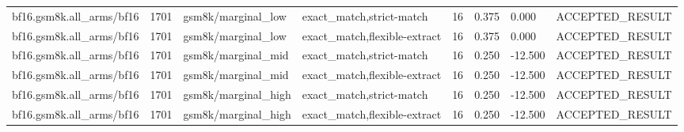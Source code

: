 \begin{tabular}{llllllll}
bf16.gsm8k.all\_arms/bf16 & 1701 & gsm8k/marginal\_low & exact\_match,strict-match & 16 & 0.375 & 0.000 & ACCEPTED\_RESULT \\
bf16.gsm8k.all\_arms/bf16 & 1701 & gsm8k/marginal\_low & exact\_match,flexible-extract & 16 & 0.375 & 0.000 & ACCEPTED\_RESULT \\
bf16.gsm8k.all\_arms/bf16 & 1701 & gsm8k/marginal\_mid & exact\_match,strict-match & 16 & 0.250 & -12.500 & ACCEPTED\_RESULT \\
bf16.gsm8k.all\_arms/bf16 & 1701 & gsm8k/marginal\_mid & exact\_match,flexible-extract & 16 & 0.250 & -12.500 & ACCEPTED\_RESULT \\
bf16.gsm8k.all\_arms/bf16 & 1701 & gsm8k/marginal\_high & exact\_match,strict-match & 16 & 0.250 & -12.500 & ACCEPTED\_RESULT \\
bf16.gsm8k.all\_arms/bf16 & 1701 & gsm8k/marginal\_high & exact\_match,flexible-extract & 16 & 0.250 & -12.500 & ACCEPTED\_RESULT \\
\hline
\end{tabular}
